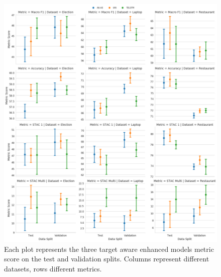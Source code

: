 \begin{figure}[!h]
    \centering
    \includegraphics[scale=0.4]{images/augmentation/methods_performance/Inter_Target/overall_inter_target_scores.png}
    \caption{Each plot represents the three target aware enhanced models metric score on the test and validation splits. Columns represent different datasets, rows different metrics.}
    \label{fig:aug_overall_inter_target_scores.png}
\end{figure}
